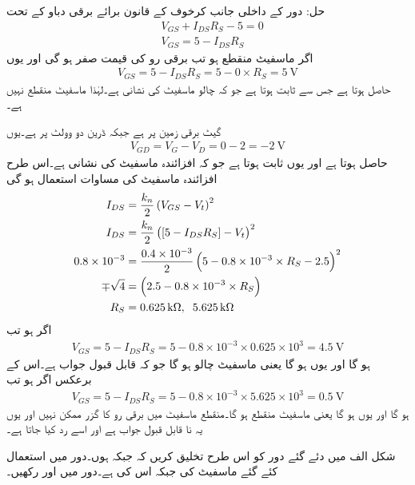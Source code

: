 حل:	دور کے داخلی جانب کرخوف کے قانون برائے برقی دباو کے تحت
\begin{align*}
& V_{GS}+I_{DS}R_S-5=0\\
& V_{GS}=5-I_{DS}R_S
\end{align*}
اگر ماسفیٹ منقطع ہو تب برقی رو کی قیمت صفر ہو گی اور یوں
\begin{align*}
V_{GS}=5-I_{DS}R_S=5-0 \times R_S =\SI{5}{\volt}
\end{align*}
حاصل ہوتا ہے جس سے   ثابت ہوتا ہے جو کہ چالو ماسفیٹ کی نشانی ہے۔لہٰذا ماسفیٹ منقطع نہیں ہے۔

گیٹ برقی زمین پر ہے جبکہ ڈرین دو وولٹ پر ہے۔یوں
\begin{align*}
V_{GD}=V_{G}-V_{D}=0-2=\SI{-2}{\volt}
\end{align*}
حاصل ہوتا ہے اور یوں  ثابت ہوتا ہے جو کہ افزائندہ ماسفیٹ کی نشانی ہے۔اس طرح افزائندہ ماسفیٹ کی مساوات استعمال ہو گی
\begin{align*}
I_{DS}&=\frac{k_n}{2} \left(V_{GS}-V_t \right )^{2}\\
I_{DS}&=\frac{k_n}{2} \left([5-I_{DS}R_S]-V_t \right )^{2}\\
0.8 \times 10^{-3}&=\frac{0.4 \times 10^{-3}}{2} \left(5-0.8 \times 10^{-3} \times R_S-2.5 \right )^{2}\\
\mp \sqrt{4}&=\left(2.5-0.8 \times 10^{-3} \times R_S \right )\\
R_S&=\SI{0.625}{\kilo \ohm},\hspace{2mm} \SI{5.625}{\kilo \ohm}
\end{align*}
اگر  ہو تب
\begin{align*}
V_{GS}=5-I_{DS}R_S=5-0.8 \times 10^{-3} \times 0.625 \times 10^{3}=\SI{4.5}{\volt}
\end{align*}
ہو گا اور یوں  ہو گا یعنی ماسفیٹ چالو ہو گا جو کہ قابل قبول جواب ہے۔اس کے برعکس اگر  
ہو تب
\begin{align*}
V_{GS}=5-I_{DS}R_S=5-0.8 \times 10^{-3} \times 5.625 \times 10^3 =\SI{0.5}{\volt}
\end{align*}
ہو گا اور یوں  ہو گا یعنی ماسفیٹ منقطع ہو گا۔منقطع ماسفیٹ میں برقی رو کا گزر ممکن نہیں اور یوں یہ نا قابل قبول جواب ہے اور اسے رد کیا جاتا ہے۔


شکل  الف میں دئے گئے دور کو اس طرح تخلیق کریں کہ   جبکہ  ہوں۔دور میں استعمال کئے گئے ماسفیٹ کی   جبکہ اس کی   ہے۔دور میں  اور  رکھیں۔

